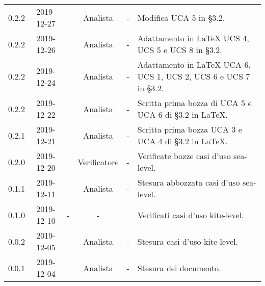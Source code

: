 {\begin{longtable}{ c c  C{2.5cm} c C{3cm} C{3.5cm}}
0.2.2 & 2019-12-27 & \PF{} & Analista & - & Modifica UCA 5 in §3.2. \\

0.2.2 & 2019-12-26 & \CE{} & Analista & - & Adattamento in \LaTeX{} UCS 4, UCS 5 e UCS 8 in §3.2. \\

0.2.2 & 2019-12-24 & \DF{} & Analista & - & Adattamento in \LaTeX{} UCA 6, UCS 1, UCS 2, UCS 6 e UCS 7 in §3.2. \\

0.2.2 & 2019-12-22 & \PF{} & Analista & - & Scritta prima bozza di UCA 5 e UCA 6 di §3.2 in \LaTeX. \\

0.2.1 & 2019-12-21 & \PF{} & Analista & - & Scritta prima bozza UCA 3 e UCA 4 di §3.2 in \LaTeX. \\

0.2.0 & 2019-12-20 & \SE{} & Verificatore & - & Verificate bozze casi d'uso sea-level. \\

0.1.1 & 2019-12-11 & \DF{} & Analista & - & Stesura abbozzata casi d'uso sea-level. \\

0.1.0 & 2019-12-10 & - & - & \BR{} & Verificati casi d'uso kite-level. \\

0.0.2 & 2019-12-05 & \CE{} & Analista & - & Stesura casi d'uso kite-level. \\

0.0.1 & 2019-12-04 & \CE{} & Analista & - & Stesura del documento. \\		
		
\end{longtable}
}